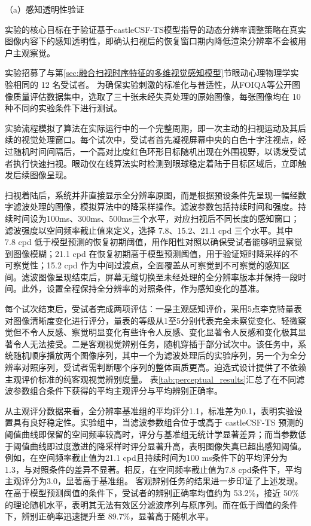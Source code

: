 （a）感知透明性验证

实验的核心目标在于验证基于castleCSF-TS模型指导的动态分辨率调整策略在真实图像内容下的感知透明性，即确认扫视后的恢复窗口期内降低渲染分辨率不会被用户主观察觉。

实验招募了与第\ref{sec:融合扫视时序特征的多维视觉感知模型}节眼动心理物理学实验相同的 12 名受试者。
为确保实验刺激的标准化与普适性，从FOIQA等公开图像质量评估数据集中，选取了三十张未经失真处理的原始图像，每张图像均在 10 种不同的实验条件下进行测试。

实验流程模拟了算法在实际运行中的一个完整周期，即一次主动的扫视运动及其后续的视觉处理窗口。每个试次中，受试者首先凝视屏幕中央的白色十字注视点，经过随机时间间隔后，一个高对比度红色环形目标随机出现在外围视野，以诱发受试者执行快速扫视。眼动仪在线算法实时检测到眼球稳定着陆于目标区域后，立即触发后续图像呈现。

扫视着陆后，系统并非直接显示全分辨率原图，而是根据预设条件先呈现一幅经数字滤波处理的图像，模拟算法中的降采样操作。滤波参数包括持续时间和强度。持续时间设为100ms、300ms、500ms三个水平，对应扫视后不同长度的感知窗口；滤波强度以空间频率截止值来定义，选择 7.8、15.2、21.1 cpd 三个水平。其中 7.8 cpd 低于模型预测的恢复初期阈值，用作阳性对照以确保受试者能够明显察觉到图像模糊；21.1 cpd 在恢复初期高于模型预测阈值，用于验证短时降采样的不可察觉性；15.2 cpd 作为中间过渡点，全面覆盖从可察觉到不可察觉的感知区间。滤波图像呈现结束后，屏幕无缝切换至未经处理的全分辨率版本并保持一段时间。此外，设置全程保持全分辨率的对照条件，作为感知变化的基准。

每个试次结束后，受试者完成两项评估：一是主观感知评价，采用5点李克特量表对图像清晰度变化进行评分，量表的等级从1至5分别代表完全未察觉变化、轻微察觉但不令人反感、察觉明显变化有些许令人反感、变化显著令人反感和变化极其显著令人无法接受。二是客观视觉辨别任务，随机穿插于部分试次中。该任务中，系统随机顺序播放两个图像序列，其中一个为滤波处理后的实验序列，另一个为全分辨率对照序列，受试者需判断哪个序列的整体画质更高。迫选式设计提供了不依赖主观评价标准的纯客观视觉辨别度量。
表\ref{tab:perceptual_results}汇总了在不同滤波参数组合条件下获得的平均主观评分与平均辨别正确率。

从主观评分数据来看，全分辨率基准组的平均评分1.1，标准差为0.1，表明实验设置具有良好稳定性。实验组中，当滤波参数组合位于或高于 castleCSF-TS 预测的阈值曲线即保留的空间频率较高时，评分与基准组无统计学显著差异；而当参数低于阈值曲线即过度激进的降采样时评分显著升高，表明图像失真已超出感知阈值。
例如，在空间频率截止值为21.1 cpd且持续时间为100 ms条件下的平均评分为1.3，与对照条件的差异不显著。相反，在空间频率截止值为7.8 cpd条件下，平均主观评分为3.0，显著高于基准组。
客观辨别任务的结果进一步印证了上述发现。在高于模型预测阈值的条件下，受试者的辨别正确率均值约为 53.2\%，接近 50\% 的理论随机水平，表明其无法有效区分滤波序列与原序列。而在低于阈值的条件下，辨别正确率迅速提升至 89.7\%，显著高于随机水平。

